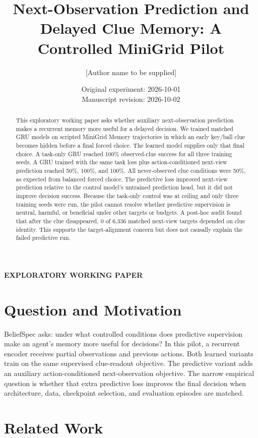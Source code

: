 \documentclass[11pt]{article}
\title{Next-Observation Prediction and Delayed Clue Memory: A Controlled MiniGrid Pilot}
\author{[Author name to be supplied]}
\date{Original experiment: 2026-10-01\\Manuscript revision: 2026-10-02}
\begin{document}
\maketitle
\begin{center}
\large\textbf{EXPLORATORY WORKING PAPER}
\end{center}

\begin{abstract}
This exploratory working paper asks whether auxiliary next-observation prediction makes a recurrent memory more useful for a delayed decision. We trained matched GRU models on scripted MiniGrid Memory trajectories in which an early key/ball clue becomes hidden before a final forced choice. The learned model supplies only that final choice. A task-only GRU reached 100\% observed-clue success for all three training seeds. A GRU trained with the same task loss plus action-conditioned next-view prediction reached 50\%, 100\%, and 100\%. All never-observed clue conditions were 50\%, as expected from balanced forced choice. The predictive loss improved next-view prediction relative to the control model's untrained prediction head, but it did not improve decision success. Because the task-only control was at ceiling and only three training seeds were run, the pilot cannot resolve whether predictive supervision is neutral, harmful, or beneficial under other targets or budgets. A post-hoc audit found that after the clue disappeared, 0 of 6,336 matched next-view targets depended on clue identity. This supports the target-alignment concern but does not causally explain the failed predictive run.
\end{abstract}

\section{Question and Motivation}

BeliefSpec asks: under what controlled conditions does predictive supervision make an agent's memory more useful for decisions? In this pilot, a recurrent encoder receives partial observations and previous actions. Both learned variants train on the same supervised clue-readout objective. The predictive variant adds an auxiliary action-conditioned next-observation objective. The narrow empirical question is whether that extra predictive loss improves the final decision when architecture, data, checkpoint selection, and evaluation episodes are matched.

\section{Related Work}
\end{document}
